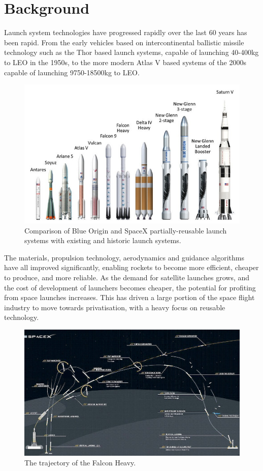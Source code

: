       \chapter{Background}
   Launch system technologies have progressed rapidly over the last 60 years has been rapid. From the early vehicles based on intercontinental ballistic missile technology such as the Thor based launch systems, capable of launching 40-400kg to LEO in the 1950s, to the more modern Atlas V based systems of the 2000s capable of launching 9750-18500kg to LEO\cite{Kendall2010}. 
         \begin{figure}[ht]
         	\centering
         	\includegraphics[width=0.9\linewidth]{figures/2_literature-review/LaunchVehicles}
         	\caption{Comparison of Blue Origin and SpaceX partially-reusable launch systems with existing and historic launch systems\cite{BlueOrigin}.}
         	\label{fig:LaunchVehicles}
         \end{figure}
    The materials, propulsion technology, aerodynamics and guidance algorithms have all improved significantly, enabling  rockets to become more efficient, cheaper to produce, and more reliable. As the demand for satellite launches grows, and the cost of development of launchers becomes cheaper, the potential for profiting from space launches increases. 
    This has driven a large portion of the space flight industry to move towards privatisation, with a heavy focus on reusable technology. 
        \begin{figure}[ht]
        	\centering
        	\includegraphics[width=1\linewidth]{"figures/2_literature-review/FalconTrajectory"}
        	\caption{The trajectory of the Falcon Heavy\cite{FalconHeavy}.}
        	\label{fig:FalconTrajectory}
        \end{figure}

